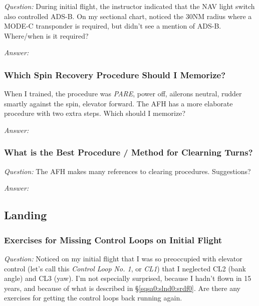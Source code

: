 \documentclass[letterpaper,10pt,titlepage]{article}
\begin{document}
\emph{Question:} During initial flight, the instructor indicated that the NAV
light switch also controlled ADS-B.  On my sectional chart, noticed the 30NM
radius where a MODE-C transponder is required, but didn't see a mention of ADS-B.
Where/when is it required?

\noindent{}\emph{Answer:}



\subsubsection{Which Spin Recovery Procedure Should I Memorize?}
\label{sqsa0:sfig0:swsr0}

When I trained, the procedure was \emph{PARE}, power off, ailerons neutral,
rudder smartly against the spin, elevator forward.  The AFH has a more elaborate
procedure with two extra steps.  Which should I memorize?

\noindent{}\emph{Answer:}



\subsubsection{What is the Best Procedure / Method for Clearning Turns?}
\label{sqsa0:sfig0:sclt0}

\emph{Question:} The AFH makes many references to clearing procedures.  Suggestions?

\noindent{}\emph{Answer:}


\subsection{Landing}
\label{sqsa0:slnd0}


\subsubsection{Exercises for Missing Control Loops on Initial Flight}
\label{sqsa0:slnd0:slhy0}

\emph{Question:} Noticed on my initial flight that I was so preoccupied with
elevator control (let's call this \emph{Control Loop No. 1}, or \emph{CL1})
that I neglected CL2 (bank angle) and CL3 (yaw).  I'm not especially surprised,
because I hadn't flown in 15 years, and because of what is described in
\S{}\ref{sqsa0:slnd0:srdf0}.  Are there any exercises for getting the control loops
back running again.
\end{document}
